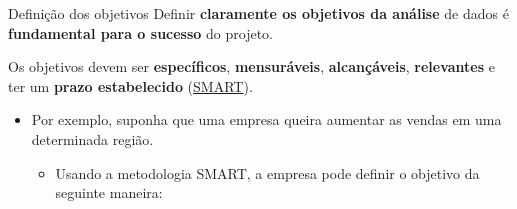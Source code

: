 \documentclass[
  ignorenonframetext,
  aspectratio=169,
]{beamer}
\providecommand{\tightlist}{%
  \setlength{\itemsep}{0pt}\setlength{\parskip}{0pt}}
\begin{document}
\begin{frame}{Definição dos objetivos}
\label{definiuxe7uxe3o-dos-objetivos}
Definir \textbf{claramente os objetivos da análise} de dados é
\textbf{fundamental para o sucesso} do projeto.

\pause

Os objetivos devem ser \textbf{específicos}, \textbf{mensuráveis},
\textbf{alcançáveis}, \textbf{relevantes} e ter um \textbf{prazo
estabelecido}
(\href{https://deolhonofuturo.uninter.com/metodologia-smart/?gclid=CjwKCAjw8-OhBhB5EiwADyoY1TeU-iDp_vyUvve_TLMgNiTOO2t_ZZKzN3bCyLVwzB52-c6NrwJLBhoC3tEQAvD_BwE}{SMART}).

\pause

\begin{itemize}
\item
  Por exemplo, suponha que uma empresa queira aumentar as vendas em uma
  determinada região.

  \begin{itemize}
  \tightlist
  \item
    Usando a metodologia SMART, a empresa pode definir o objetivo da
    seguinte maneira:
  \end{itemize}
\end{itemize}
\end{frame}
\end{document}
